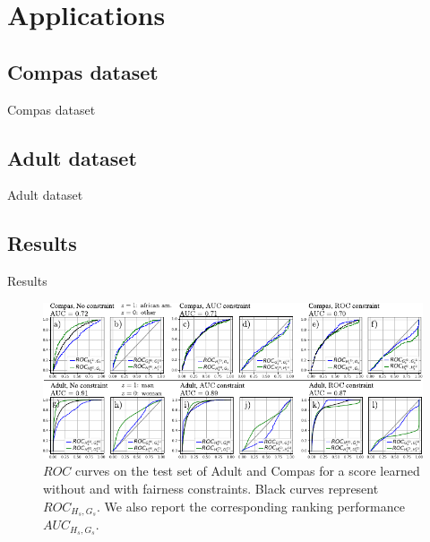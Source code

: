 \section{Applications}

\subsection{Compas dataset}
\begin{frame}{Compas dataset}
\end{frame}

\subsection{Adult dataset}
\begin{frame}{Adult dataset}
\end{frame}

\subsection{Results}
\begin{frame}{Results}
    \begin{figure}
        \centering
        \includegraphics[width=\textwidth]{images/original_paper/main_text_inkscape_all_rocs_no_train_new.pdf}
            \caption{$ROC$ curves on the test set of Adult and Compas
            for a score learned without and with fairness constraints.
            Black curves represent $ROC_{H_s,G_s}$. We also report the corresponding
           ranking performance $AUC_{H_s,G_s}$.}
            \label{fig:roc_real_main_text}
    \end{figure}
        
\end{frame}
